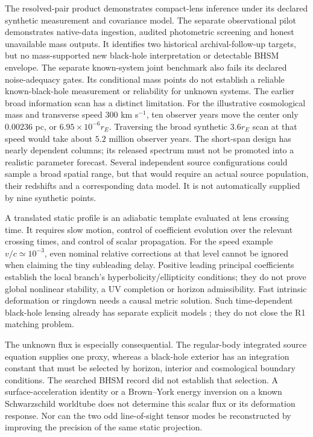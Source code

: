 \documentclass[11pt,a4paper]{article}
\begin{document}
The resolved-pair product demonstrates compact-lens inference under its
declared synthetic measurement and covariance model. The separate
observational pilot demonstrates native-data ingestion, audited
photometric screening and honest unavailable mass outputs. It identifies
two historical archival-follow-up targets, but no mass-supported new
black-hole interpretation or detectable BHSM envelope. The separate known-system
joint benchmark also fails its declared noise-adequacy gates. Its conditional
mass points do not establish a reliable known-black-hole measurement or
reliability for unknown systems. The earlier broad information
scan has a distinct limitation. For the illustrative cosmological mass and transverse
speed $300$ km s$^{-1}$, ten observer years move the center only
$0.00236$ pc, or $6.95\times10^{-6}r_E$. Traversing the broad synthetic
$3.6r_E$ scan at that speed would take about $5.2$ million observer years.
The short-span design has nearly dependent columns; its released
spectrum must not be promoted into a realistic parameter forecast.
Several independent source configurations could sample a broad spatial
range, but that would require an actual source population, their
redshifts and a corresponding data model. It is not automatically
supplied by nine synthetic points.

A translated static profile is an adiabatic template evaluated at lens
crossing time. It requires slow motion, control of coefficient evolution
over the relevant crossing times, and control of scalar propagation.
For the speed example $v/c\simeq10^{-3}$, even nominal relative
corrections at that level cannot be ignored when claiming the tiny
subleading delay. Positive leading principal coefficients establish the
local branch's hyperbolicity/ellipticity conditions; they do not prove
global nonlinear stability, a UV completion or horizon admissibility.
Fast intrinsic deformation or ringdown needs a causal metric solution.
Such time-dependent black-hole lensing already has separate explicit
models \cite{Pantig2026}; they do not close the R1 matching problem.

The unknown flux is especially consequential. The regular-body integrated
source equation supplies one proxy, whereas a black-hole exterior has
an integration constant that must be selected by horizon, interior and
cosmological boundary conditions. The searched BHSM record did not
establish that selection. A surface-acceleration identity or a
Brown--York energy inversion on a known Schwarzschild worldtube does
not determine this scalar flux or its deformation response. Nor can the
two odd line-of-sight tensor modes be reconstructed by improving the
precision of the same static projection.
\end{document}

